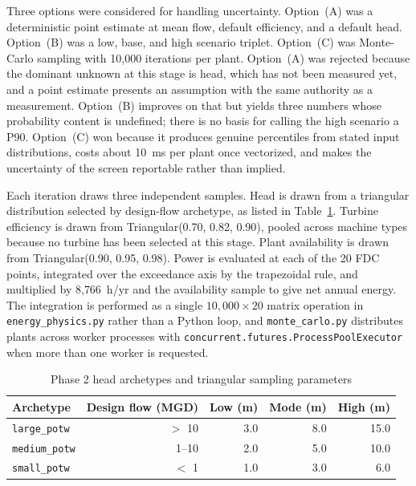 \documentclass[12pt,letterpaper]{report}
\begin{document}
Three options were considered for handling uncertainty. Option~(A) was a
deterministic point estimate at mean flow, default efficiency, and a default
head. Option~(B) was a low, base, and high scenario triplet. Option~(C) was
Monte-Carlo sampling with 10{,}000 iterations per plant. Option~(A) was rejected
because the dominant unknown at this stage is head, which has not been measured
yet, and a point estimate presents an assumption with the same authority as a
measurement. Option~(B) improves on that but yields three numbers whose
probability content is undefined; there is no basis for calling the high
scenario a P90. Option~(C) won because it produces genuine percentiles from
stated input distributions, costs about 10~ms per plant once vectorized, and
makes the uncertainty of the screen reportable rather than implied.

Each iteration draws three independent samples. Head is drawn from a triangular
distribution selected by design-flow archetype, as listed in
Table~\ref{tab:head_archetypes}. Turbine efficiency is drawn from
Triangular(0.70, 0.82, 0.90), pooled across machine types because no turbine has
been selected at this stage. Plant availability is drawn from Triangular(0.90,
0.95, 0.98). Power is evaluated at each of the 20 FDC points, integrated over the
exceedance axis by the trapezoidal rule, and multiplied by 8{,}766~h/yr and the
availability sample to give net annual energy. The integration is performed as a
single $10{,}000 \times 20$ matrix operation in \texttt{energy\_physics.py}
rather than a Python loop, and \texttt{monte\_carlo.py} distributes plants across
worker processes with \texttt{concurrent.futures.ProcessPoolExecutor} when more
than one worker is requested.

\begin{table}[htbp]
\centering
\caption{Phase 2 head archetypes and triangular sampling parameters}
\label{tab:head_archetypes}
\begin{tabular}{lrrrr}
\toprule
Archetype & Design flow (MGD) & Low (m) & Mode (m) & High (m) \\
\midrule
\texttt{large\_potw}  & $>$ 10      & 3.0 & 8.0 & 15.0 \\
\texttt{medium\_potw} & 1--10       & 2.0 & 5.0 & 10.0 \\
\texttt{small\_potw}  & $<$ 1       & 1.0 & 3.0 & 6.0 \\
\bottomrule
\end{tabular}
\end{table}
\end{document}
